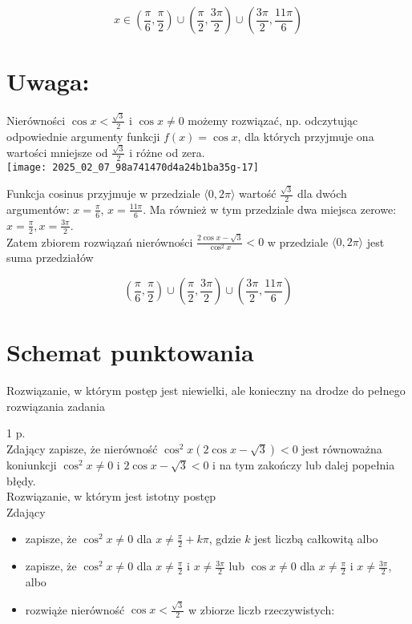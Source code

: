 \documentclass[10pt]{article}
\begin{document}
$$
x \in\left(\frac{\pi}{6}, \frac{\pi}{2}\right) \cup\left(\frac{\pi}{2}, \frac{3 \pi}{2}\right) \cup\left(\frac{3 \pi}{2}, \frac{11 \pi}{6}\right)
$$

\section*{Uwaga:}
Nierówności $\cos x<\frac{\sqrt{3}}{2}$ i $\cos x \neq 0$ możemy rozwiązać, np. odczytując odpowiednie argumenty funkcji $f(x)=\cos x$, dla których przyjmuje ona wartości mniejsze od $\frac{\sqrt{3}}{2}$ i różne od zera.\\
\texttt{[image: 2025\_02\_07\_98a741470d4a24b1ba35g-17]}

Funkcja cosinus przyjmuje w przedziale $\langle 0,2 \pi\rangle$ wartość $\frac{\sqrt{3}}{2}$ dla dwóch argumentów: $x=\frac{\pi}{6}$, $x=\frac{11 \pi}{6}$. Ma również w tym przedziale dwa miejsca zerowe: $x=\frac{\pi}{2}, x=\frac{3 \pi}{2}$.\\
Zatem zbiorem rozwiązań nierówności $\frac{2 \cos x-\sqrt{3}}{\cos ^{2} x}<0$ w przedziale $\langle 0,2 \pi\rangle$ jest suma przedziałów

$$
\left(\frac{\pi}{6}, \frac{\pi}{2}\right) \cup\left(\frac{\pi}{2}, \frac{3 \pi}{2}\right) \cup\left(\frac{3 \pi}{2}, \frac{11 \pi}{6}\right)
$$

\section*{Schemat punktowania}
Rozwiązanie, w którym postęp jest niewielki, ale konieczny na drodze do pełnego rozwiązania zadania

1 p.\\
Zdający zapisze, że nierówność $\cos ^{2} x(2 \cos x-\sqrt{3})<0$ jest równoważna koniunkcji $\cos ^{2} x \neq 0$ i $2 \cos x-\sqrt{3}<0$ i na tym zakończy lub dalej popełnia błędy.\\
Rozwiązanie, w którym jest istotny postęp\\
Zdający

\begin{itemize}
  \item zapisze, że $\cos ^{2} x \neq 0$ dla $x \neq \frac{\pi}{2}+k \pi$, gdzie $k$ jest liczbą całkowitą albo
  \item zapisze, że $\cos ^{2} x \neq 0$ dla $x \neq \frac{\pi}{2}$ i $x \neq \frac{3 \pi}{2}$ lub $\cos x \neq 0$ dla $x \neq \frac{\pi}{2}$ i $x \neq \frac{3 \pi}{2}$, albo
  \item rozwiąże nierówność $\cos x<\frac{\sqrt{3}}{2}$ w zbiorze liczb rzeczywistych:
\end{itemize}
\end{document}
